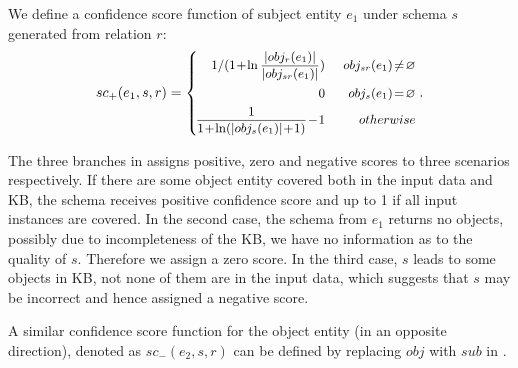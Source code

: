 We define a confidence score function of subject entity 
$e_1$ under schema $s$ generated from relation $r$: 
\begin{equation}
\label{eqn:scp}
\small
  sc_+(e_1, s, r) = \left\{
  	\begin{aligned}
	\! 1 / ( 1 \! + \! \ln \frac 
	  {\left| obj_r(e_1) \right|} 
	  {\left| obj_{sr}(e_1) \right|} 
	)    & ~ & obj_{sr}(e_1) \! \neq \! \varnothing  \\
	\! 0 & ~ & obj_s(e_1) \! = \! \varnothing        \\
	\! \frac {1} {
	  1 \! + \! \ln (\left| obj_s(e_1) \right| \! + \! 1)
	} \! - \! 1  & ~ & otherwise    \\
	\end{aligned}
  \right..
\end{equation}
\normalsize

The three branches in  assigns positive, zero and negative
scores to three scenarios respectively. If there are some object entity covered
both in the input data and KB, the schema receives positive confidence score 
and up to 1 if all input instances are covered.
In the second case, the schema from $e_1$ returns no objects, possibly due to
incompleteness of the KB, we have no information as to the quality of $s$.
Therefore we assign a zero score. In the third case, $s$ leads to some
objects in KB, not none of them are in the input data, which suggests that
$s$ may be incorrect and hence assigned a negative score. 

A similar confidence score function for the object entity (in an opposite
direction), denoted as $sc_-(e_2, s, r)$ can be defined by replacing
$obj$ with $sub$ in .

